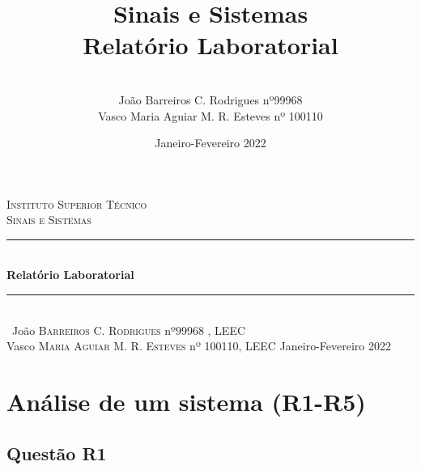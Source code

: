 \documentclass[a4paper,12pt]{article}
\date{Janeiro-Fevereiro 2022}
\title{Sinais e Sistemas \\ \large {Relatório Laboratorial}}
\author{
\\ João Barreiros C. Rodrigues nº99968
\\Vasco Maria  Aguiar M. R. Esteves nº 100110 }
\begin{document}
	\begin{titlepage} %
        \newcommand{\HRule}{\rule{\linewidth}{0.5mm}} %
        \center %
        \textsc{\LARGE Instituto Superior Técnico}\\[1.5cm] %
        \textsc{\Large Sinais e Sistemas}\\[0.5cm] %
        \HRule\\[0.4cm]
        {\huge\bfseries Relatório Laboratorial}\\[0.4cm] %
        \HRule\\[1.5cm]\
        João \textsc{Barreiros C. Rodrigues} nº99968 , LEEC\\
	Vasco \textsc{Maria  Aguiar M. R. Esteves} nº 100110, LEEC
        \vfill\vfill\vfill %
        {\large Janeiro-Fevereiro 2022} %
        \vfill %
\end{titlepage}
	\newpage
	\section{Análise de um sistema (R1-R5)}
		\subsection{Questão R1}
\end{document}
